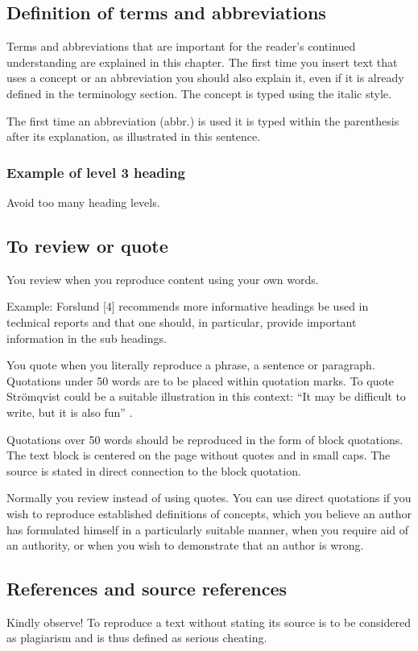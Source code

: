 \subsection{Definition of terms and abbreviations}
\label{ch:theory:definitions}
Terms and abbreviations that are important for the reader's continued understanding are explained in this chapter. The first time you insert text that uses a concept or an abbreviation you should also explain it, even if it is already defined in the terminology section. The concept is typed using the italic style.

The first time an abbreviation (abbr.) is used it is typed within the parenthesis after its explanation, as illustrated in this sentence.

\subsubsection{Example of level 3 heading}
\label{ch:theory:level3-heading}
Avoid too many heading levels.

\subsection{To review or quote}
\label{ch:theory:review:quote}
You review when you reproduce content using your own words.

Example: Forslund [4] recommends more informative headings be used in technical reports and that one should, in particular, provide important information in the sub headings.

You quote when you literally reproduce a phrase, a sentence or paragraph. Quotations under 50 words are to be placed within quotation marks. To quote Strömqvist could be a suitable illustration in this context: “It may be difficult to write, but it is also fun” \cite{stomquist}.

Quotations over 50 words should be reproduced in the form of block quotations. The text block is centered on the page without quotes and in small caps. The source is stated in direct connection to the block quotation.

Normally you review instead of using quotes. You can use direct quotations if you wish to reproduce established definitions of concepts, which you believe an author has formulated himself in a particularly suitable manner, when you require aid of an authority, or when you wish to demonstrate that an author is wrong.

\subsection{References and source references}
Kindly observe! To reproduce a text without stating its source is to be considered as plagiarism and is thus defined as serious cheating.

